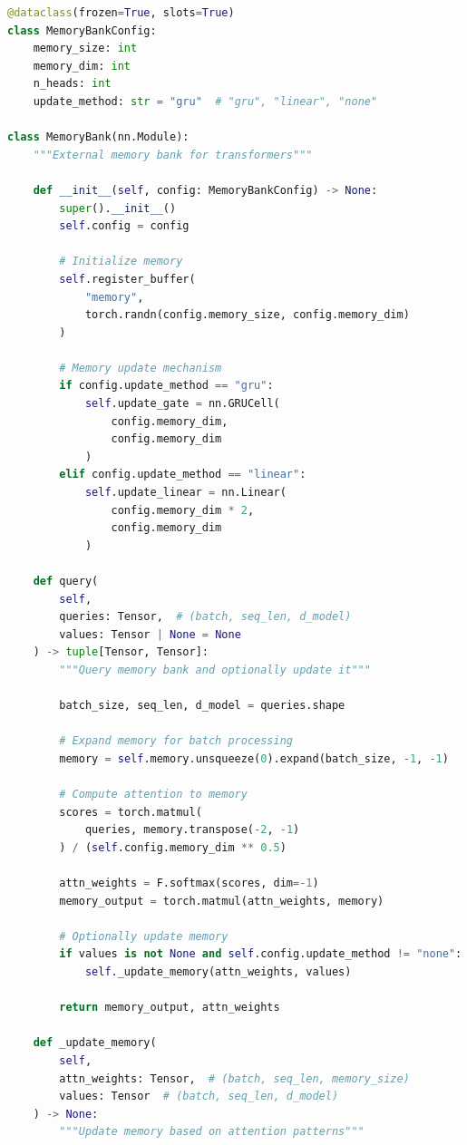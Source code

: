\begin{lstlisting}[language=Python, caption=Memory-Augmented Transformer]
@dataclass(frozen=True, slots=True)
class MemoryBankConfig:
    memory_size: int
    memory_dim: int
    n_heads: int
    update_method: str = "gru"  # "gru", "linear", "none"

class MemoryBank(nn.Module):
    """External memory bank for transformers"""

    def __init__(self, config: MemoryBankConfig) -> None:
        super().__init__()
        self.config = config

        # Initialize memory
        self.register_buffer(
            "memory",
            torch.randn(config.memory_size, config.memory_dim)
        )

        # Memory update mechanism
        if config.update_method == "gru":
            self.update_gate = nn.GRUCell(
                config.memory_dim,
                config.memory_dim
            )
        elif config.update_method == "linear":
            self.update_linear = nn.Linear(
                config.memory_dim * 2,
                config.memory_dim
            )

    def query(
        self,
        queries: Tensor,  # (batch, seq_len, d_model)
        values: Tensor | None = None
    ) -> tuple[Tensor, Tensor]:
        """Query memory bank and optionally update it"""

        batch_size, seq_len, d_model = queries.shape

        # Expand memory for batch processing
        memory = self.memory.unsqueeze(0).expand(batch_size, -1, -1)

        # Compute attention to memory
        scores = torch.matmul(
            queries, memory.transpose(-2, -1)
        ) / (self.config.memory_dim ** 0.5)

        attn_weights = F.softmax(scores, dim=-1)
        memory_output = torch.matmul(attn_weights, memory)

        # Optionally update memory
        if values is not None and self.config.update_method != "none":
            self._update_memory(attn_weights, values)

        return memory_output, attn_weights

    def _update_memory(
        self,
        attn_weights: Tensor,  # (batch, seq_len, memory_size)
        values: Tensor  # (batch, seq_len, d_model)
    ) -> None:
        """Update memory based on attention patterns"""


\end{lstlisting}
